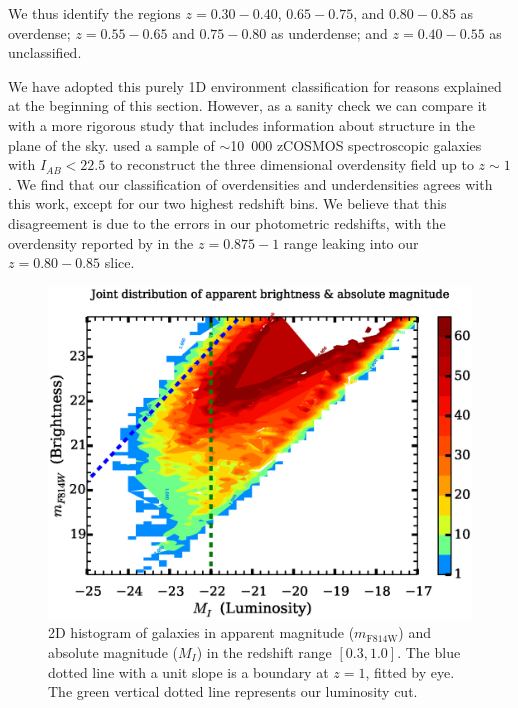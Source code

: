 \documentclass[twocolumn,useAMS,usenatbib]{mn2e}
\begin{document}
We thus identify the regions $z=0.30-0.40$, $0.65-0.75$, and
$0.80-0.85$ as overdense; $z=0.55-0.65$ and $0.75-0.80$ as underdense; and $z=0.40-0.55$ as unclassified. 

We have adopted this purely 1D environment classification for reasons
explained at the beginning of this section. However, as a sanity check
we can compare it with a more rigorous study that includes information
about structure in the plane of the sky.  
 \cite{Kovac_Density10k} used a sample of $\sim$10~000 zCOSMOS
 spectroscopic galaxies with $I_{AB}<22.5$ to reconstruct the three dimensional overdensity field up to $z\sim 1$.
We find that our classification of overdensities and underdensities
agrees with this work, except for our two highest redshift bins.
We believe that this disagreement is due to the errors in our
photometric redshifts, with the overdensity reported by
\cite{Kovac_Density10k} in the $z=0.875-1$ range 
leaking into our $z=0.80-0.85$ slice.

\begin{figure}
  \centering
   \includegraphics[width=1.0\columnwidth]{hist2d_mag_mi}
   \caption{2D histogram of galaxies in apparent magnitude
     ($m_\text{F814W}$) and absolute magnitude ($M_I$) in the redshift range $[0.3, 1.0]$. The blue dotted line with a unit slope is a boundary at $z=1$, fitted by eye.
     The green vertical dotted line represents our luminosity cut. } 
   \label{fig:2Dhist}
\end{figure}
\end{document}
